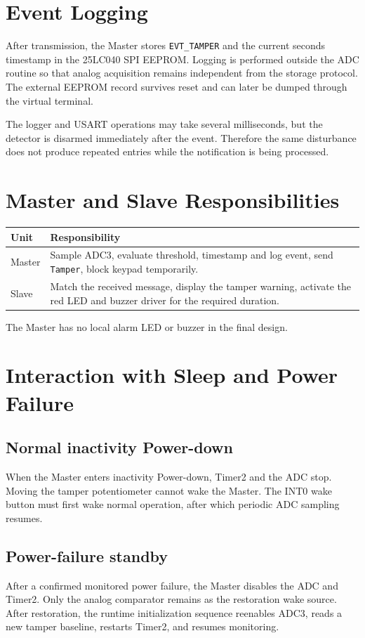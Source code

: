 \documentclass[11pt,a4paper]{article}
\begin{document}
\section{Event Logging}
After transmission, the Master stores \texttt{EVT\_TAMPER} and the current seconds timestamp in the 25LC040 SPI EEPROM. Logging is performed outside the ADC routine so that analog acquisition remains independent from the storage protocol. The external EEPROM record survives reset and can later be dumped through the virtual terminal.

The logger and USART operations may take several milliseconds, but the detector is disarmed immediately after the event. Therefore the same disturbance does not produce repeated entries while the notification is being processed.

\section{Master and Slave Responsibilities}
\begin{center}
\begin{tabularx}{\textwidth}{p{}X}
\toprule
Unit & Responsibility \\
\midrule
Master & Sample ADC3, evaluate threshold, timestamp and log event, send \texttt{Tamper}, block keypad temporarily. \\
Slave & Match the received message, display the tamper warning, activate the red LED and buzzer driver for the required duration. \\
\bottomrule
\end{tabularx}
\end{center}
The Master has no local alarm LED or buzzer in the final design.

\section{Interaction with Sleep and Power Failure}
\subsection{Normal inactivity Power-down}
When the Master enters inactivity Power-down, Timer2 and the ADC stop. Moving the tamper potentiometer cannot wake the Master. The INT0 wake button must first wake normal operation, after which periodic ADC sampling resumes.

\subsection{Power-failure standby}
After a confirmed monitored power failure, the Master disables the ADC and Timer2. Only the analog comparator remains as the restoration wake source. After restoration, the runtime initialization sequence reenables ADC3, reads a new tamper baseline, restarts Timer2, and resumes monitoring.
\end{document}

